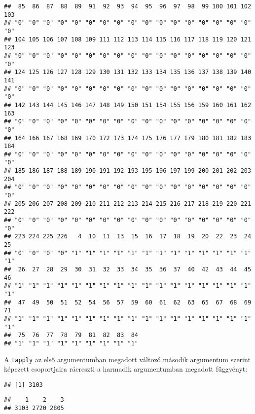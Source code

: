 \documentclass[]{book}
\newenvironment{Shaded}{\begin{snugshade}}{\end{snugshade}}
\newcommand{\DecValTok}[1]{\textcolor[rgb]{0.00,0.00,0.81}{#1}}
\newcommand{\KeywordTok}[1]{\textcolor[rgb]{0.13,0.29,0.53}{\textbf{#1}}}
\newcommand{\NormalTok}[1]{#1}
\newcommand{\OperatorTok}[1]{\textcolor[rgb]{0.81,0.36,0.00}{\textbf{#1}}}
\newcommand{\StringTok}[1]{\textcolor[rgb]{0.31,0.60,0.02}{#1}}
\begin{document}
\begin{verbatim}
##  85  86  87  88  89  91  92  93  94  95  96  97  98  99 100 101 102 103 
## "0" "0" "0" "0" "0" "0" "0" "0" "0" "0" "0" "0" "0" "0" "0" "0" "0" "0" 
## 104 105 106 107 108 109 111 112 113 114 115 116 117 118 119 120 121 123 
## "0" "0" "0" "0" "0" "0" "0" "0" "0" "0" "0" "0" "0" "0" "0" "0" "0" "0" 
## 124 125 126 127 128 129 130 131 132 133 134 135 136 137 138 139 140 141 
## "0" "0" "0" "0" "0" "0" "0" "0" "0" "0" "0" "0" "0" "0" "0" "0" "0" "0" 
## 142 143 144 145 146 147 148 149 150 151 154 155 156 159 160 161 162 163 
## "0" "0" "0" "0" "0" "0" "0" "0" "0" "0" "0" "0" "0" "0" "0" "0" "0" "0" 
## 164 166 167 168 169 170 172 173 174 175 176 177 179 180 181 182 183 184 
## "0" "0" "0" "0" "0" "0" "0" "0" "0" "0" "0" "0" "0" "0" "0" "0" "0" "0" 
## 185 186 187 188 189 190 191 192 193 195 196 197 199 200 201 202 203 204 
## "0" "0" "0" "0" "0" "0" "0" "0" "0" "0" "0" "0" "0" "0" "0" "0" "0" "0" 
## 205 206 207 208 209 210 211 212 213 214 215 216 217 218 219 220 221 222 
## "0" "0" "0" "0" "0" "0" "0" "0" "0" "0" "0" "0" "0" "0" "0" "0" "0" "0" 
## 223 224 225 226   4  10  11  13  15  16  17  18  19  20  22  23  24  25 
## "0" "0" "0" "0" "1" "1" "1" "1" "1" "1" "1" "1" "1" "1" "1" "1" "1" "1" 
##  26  27  28  29  30  31  32  33  34  35  36  37  40  42  43  44  45  46 
## "1" "1" "1" "1" "1" "1" "1" "1" "1" "1" "1" "1" "1" "1" "1" "1" "1" "1" 
##  47  49  50  51  52  54  56  57  59  60  61  62  63  65  67  68  69  71 
## "1" "1" "1" "1" "1" "1" "1" "1" "1" "1" "1" "1" "1" "1" "1" "1" "1" "1" 
##  75  76  77  78  79  81  82  83  84 
## "1" "1" "1" "1" "1" "1" "1" "1" "1"
\end{verbatim}

A \texttt{tapply} az első argumentumban megadott változó második argumentum szerint képezett csoportjaira ráereszti a harmadik argumentumban megadott függvényt:

\begin{Shaded}
\end{Shaded}

\begin{verbatim}
## [1] 3103
\end{verbatim}

\begin{Shaded}
\end{Shaded}

\begin{verbatim}
##    1    2    3 
## 3103 2720 2805
\end{verbatim}
\end{document}
